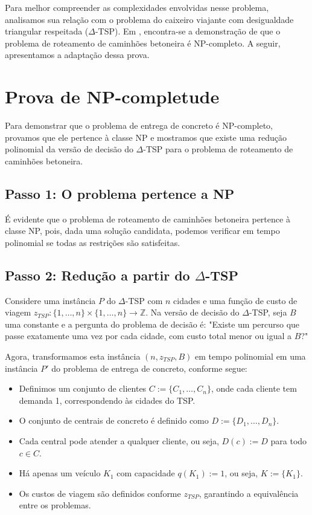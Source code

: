 Para melhor compreender as complexidades envolvidas nesse problema, analisamos sua rela\c{c}\~{a}o com o problema do caixeiro viajante com desigualdade triangular respeitada ($\Delta$-TSP). Em \cite{asbach}, encontra-se a demonstra\c{c}\~{a}o de que o problema de roteamento de caminh\~{o}es betoneira \'{e} NP-completo. A seguir, apresentamos a adapta\c{c}\~{a}o dessa prova.

\section*{Prova de NP-completude}

Para demonstrar que o problema de entrega de concreto \'{e} NP-completo, provamos que ele pertence \`{a} classe NP e mostramos que existe uma redu\c{c}\~{a}o polinomial da vers\~{a}o de decis\~{a}o do $\Delta$-TSP para o problema de roteamento de caminh\~{o}es betoneira.

\subsection*{Passo 1: O problema pertence a NP}

\'{E} evidente que o problema de roteamento de caminh\~{o}es betoneira pertence \`{a} classe NP, pois, dada uma solu\c{c}\~{a}o candidata, podemos verificar em tempo polinomial se todas as restri\c{c}\~{o}es s\~{a}o satisfeitas.

\subsection*{Passo 2: Redu\c{c}\~{a}o a partir do $\Delta$-TSP}

Considere uma inst\^{a}ncia $P$ do $\Delta$-TSP com $n$ cidades e uma fun\c{c}\~{a}o de custo de viagem $z_{TSP}: \{1, \dots, n\} \times \{1, \dots, n\} \to \mathbb{Z}$. Na vers\~{a}o de decis\~{a}o do $\Delta$-TSP, seja $B$ uma constante e a pergunta do problema de decis\~{a}o \'{e}: "Existe um percurso que passe exatamente uma vez por cada cidade, com custo total menor ou igual a $B$?"

Agora, transformamos esta inst\^{a}ncia $(n, z_{TSP}, B)$ em tempo polinomial em uma inst\^{a}ncia $P'$ do problema de entrega de concreto, conforme segue:

\begin{itemize}
    \item Definimos um conjunto de clientes $C := \{C_1, \dots, C_n\}$, onde cada cliente tem demanda 1, correspondendo \`{a}s cidades do TSP.
    \item O conjunto de centrais de concreto \'{e} definido como $D := \{D_1, \dots, D_n\}$.
    \item Cada central pode atender a qualquer cliente, ou seja, $D(c) := D$ para todo $c \in C$.
    \item H\'{a} apenas um ve\'{i}culo $K_1$ com capacidade $q(K_1) := 1$, ou seja, $K := \{K_1\}$.
    \item Os custos de viagem s\~{a}o definidos conforme $z_{TSP}$, garantindo a equival\^{e}ncia entre os problemas.
\end{itemize}


